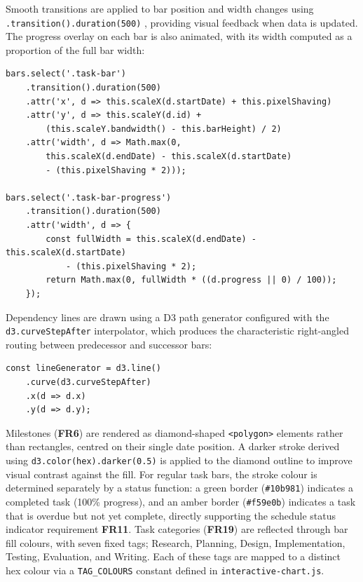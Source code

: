 \documentclass[12pt,nonacm,acmlarge,titlepage,screen]{acmart}
\begin{document}
Smooth transitions are applied to bar position and width changes using
\texttt{.transition().duration(500)} \cite{bostock_d3, geeksforgeeks_d3js_2025, w3schools_d3js_2025}, providing visual feedback when data is updated.
The progress overlay on each bar is also animated, with its width computed as a
proportion of the full bar width:

\begin{lstlisting}[style=jsstyle, caption={Animated bar and progress overlay update (gantt-chart.js)}]
bars.select('.task-bar')
    .transition().duration(500)
    .attr('x', d => this.scaleX(d.startDate) + this.pixelShaving)
    .attr('y', d => this.scaleY(d.id) +
        (this.scaleY.bandwidth() - this.barHeight) / 2)
    .attr('width', d => Math.max(0,
        this.scaleX(d.endDate) - this.scaleX(d.startDate)
        - (this.pixelShaving * 2)));

bars.select('.task-bar-progress')
    .transition().duration(500)
    .attr('width', d => {
        const fullWidth = this.scaleX(d.endDate) - this.scaleX(d.startDate)
            - (this.pixelShaving * 2);
        return Math.max(0, fullWidth * ((d.progress || 0) / 100));
    });
\end{lstlisting}

Dependency lines are drawn using a D3 path generator configured with the
\texttt{d3.curveStepAfter} interpolator, which produces the characteristic right-angled
routing between predecessor and successor bars:

\begin{lstlisting}[style=jsstyle, caption={Dependency line path generator (gantt-chart.js)}]
const lineGenerator = d3.line()
    .curve(d3.curveStepAfter)
    .x(d => d.x)
    .y(d => d.y);
\end{lstlisting}

Milestones (\textbf{FR6}\label{fr:6-vis}) are rendered as diamond-shaped \texttt{<polygon>}
elements rather than rectangles, centred on their single date position. A darker stroke
derived using \texttt{d3.color(hex).darker(0.5)} \cite{bostock_d3, geeksforgeeks_d3js_2025, w3schools_d3js_2025} is applied to the diamond outline to
improve visual contrast against the fill. For regular task bars, the stroke colour is
determined separately by a status function: a green border (\texttt{\#10b981}) indicates a
completed task (100\% progress), and an amber border (\texttt{\#f59e0b}) indicates a task
that is overdue but not yet complete, directly supporting the schedule status indicator
requirement \textbf{FR11}\label{fr:11}. Task categories (\textbf{FR19}\label{fr:19-vis})
are reflected through bar fill colours, with seven fixed tags; Research, Planning,
Design, Implementation, Testing, Evaluation, and Writing. Each of these tags are mapped to a
distinct hex colour via a \texttt{TAG\_COLOURS} constant defined in
\texttt{interactive-chart.js}.
\end{document}
